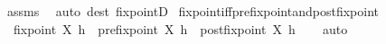 \begin{isabellebody}
\ assms\ \isamarkupfalse%
\ {\isacharparenleft}{\kern0pt}auto\ dest{\isacharcolon}{\kern0pt}\ fixpointD{\isacharparenright}{\kern0pt}%
\endisatagproof
{\isafoldproof}%
%
\isadelimproof
\isanewline
%
\endisadelimproof
\isanewline
{}\isamarkupfalse%
\ fixpoint{\isacharunderscore}{\kern0pt}iff{\isacharunderscore}{\kern0pt}prefixpoint{\isacharunderscore}{\kern0pt}and{\isacharunderscore}{\kern0pt}postfixpoint{\isacharcolon}{\kern0pt}\isanewline
\ \ {\isachardoublequoteopen}fixpoint\ X\ h\ {\isasymlongleftrightarrow}\ prefixpoint\ X\ h\ {\isasymand}\ postfixpoint\ X\ h{\isachardoublequoteclose}\isanewline
%
\isadelimproof
\ \ %
\endisadelimproof
%
\isatagproof
{}\isamarkupfalse%
\ auto%
\endisatagproof
{\isafoldproof}%
%
\isadelimproof
\isanewline
%
\endisadelimproof
\isanewline
%
\isadelimtheory
\isanewline
%
\endisadelimtheory
%
\isatagtheory
{}\isamarkupfalse%
%
\endisatagtheory
{\isafoldtheory}%
%
\isadelimtheory
%
\endisadelimtheory
%
\end{isabellebody}%
\endinput

